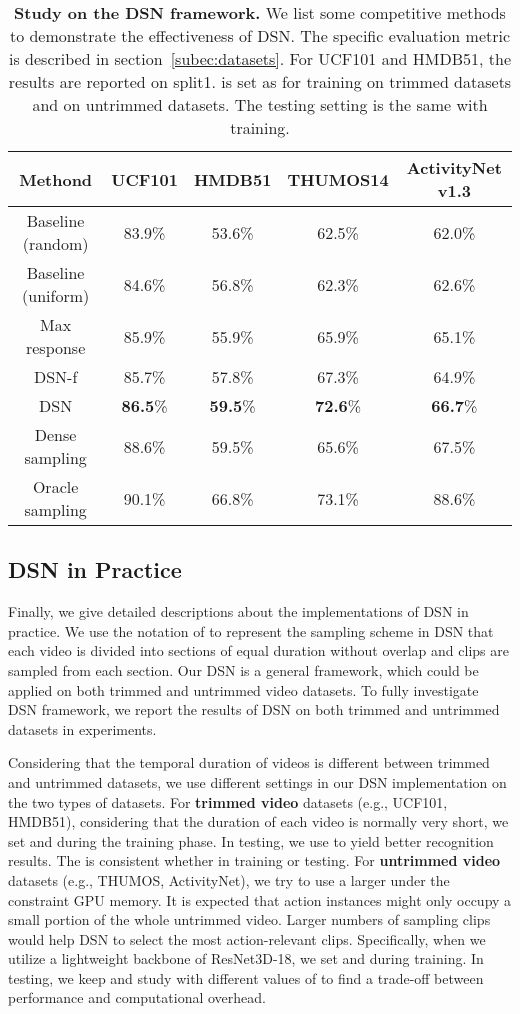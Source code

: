 \documentclass[journal]{IEEEtran}
\begin{document}
\begin{table*}[t]
\centering
\caption{{\bf Study on the DSN framework.} We list some competitive methods to demonstrate the effectiveness of DSN. The specific evaluation metric is described in section~\ref{subec:datasets}. For UCF101 and HMDB51, the results are reported on split1.  is set as  for training on trimmed datasets and  on untrimmed datasets. The testing setting is the same with training.}
\begin{tabular}{c|c|c|c|c}
\toprule[2pt]
Methond & UCF101 & HMDB51  & THUMOS14 & ActivityNet v1.3\\
\hline
Baseline (random) & 83.9\% & 53.6\% & 62.5\% & 62.0\%\\
Baseline (uniform) & 84.6\% & 56.8\% & 62.3\% & 62.6\%\\
Max response & 85.9\% & 55.9\% & 65.9\% & 65.1\%\\
\hline

DSN-f & 85.7\% & 57.8\% & 67.3\% & 64.9\%\\
DSN & \textbf{86.5}\% & \textbf{59.5}\% & \textbf{72.6}\% & \textbf{66.7}\%\\
\hline
Dense sampling & 88.6\% & 59.5\% & 65.6\% & 67.5\% \\
Oracle sampling & 90.1\% & 66.8\% & 73.1\% & 88.6\%\\
\toprule[2pt]
\end{tabular}
\label{tab:config_cmp}
\end{table*}

\subsection{DSN in Practice}
\label{sec:inference}
Finally, we give detailed descriptions about the implementations of DSN in practice. We use the notation of  to represent the sampling scheme in DSN that each video is divided into  sections of equal duration without overlap and  clips are sampled from each section. Our DSN is a general framework, which could be applied on both trimmed and untrimmed video datasets. To fully investigate DSN framework, we report the results of DSN on both trimmed and untrimmed datasets in experiments.

Considering that the temporal duration of videos is different between trimmed and untrimmed datasets, we use different settings in our DSN implementation on the two types of datasets.
For {\bf trimmed video} datasets (e.g., UCF101, HMDB51), considering that the duration of each video is normally very short, we set  and  during the training phase. In testing, we use  to yield better recognition results. The  is consistent whether in training or testing.
For {\bf untrimmed video} datasets (e.g., THUMOS, ActivityNet), we try to use a larger  under the constraint GPU memory. It is expected that action instances might only occupy a small portion of the whole untrimmed video. Larger numbers of sampling clips would help DSN to select the most action-relevant clips. Specifically,  when we utilize a lightweight backbone of ResNet3D-18,  we set  and  during training.
In testing, we keep  and study with different values of  to find a trade-off between performance and computational overhead.
\end{document}
